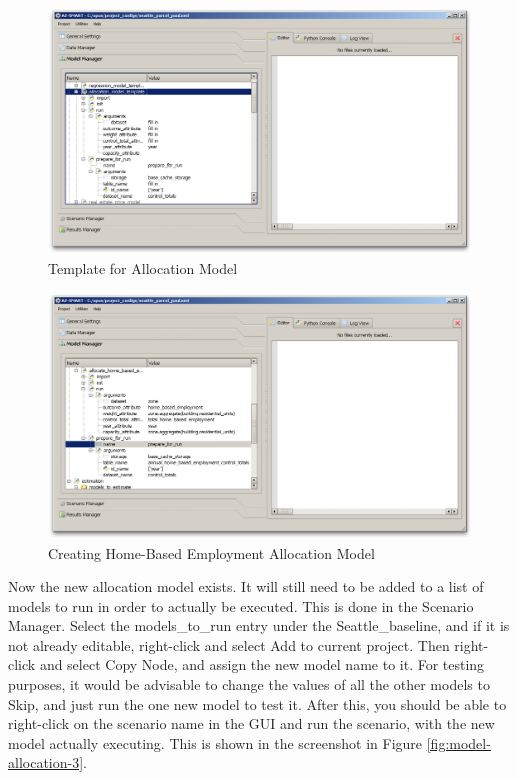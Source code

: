 \begin{figure}[htp]
\begin{center}
\includegraphics[scale=0.35]{graphics/create-model-template-allocation.png}
\end{center}
\caption{Template for Allocation Model}
\label{fig:model-allocation-1}
\end{figure}

\begin{figure}[htp]
\begin{center}
\includegraphics[scale=0.35]{graphics/create-allocation-model.png}
\end{center}
\caption{Creating Home-Based Employment Allocation Model}
\label{fig:model-allocation-2}
\end{figure}

Now the new allocation model exists.  It will still need to be added to a list of models to run in order to actually be executed.  This is done in the Scenario Manager.  Select the models\_to\_run entry under the Seattle\_baseline, and if it is not already editable, right-click and select Add to current project.  Then right-click and select Copy Node, and assign the new model name to it.  For testing purposes, it would be advisable to change the values of all the other models to Skip, and just run the one new model to test it.   After this, you should be able to right-click on the scenario name in the GUI and run the scenario, with the new model actually executing.  This is shown in the screenshot in Figure \ref{fig:model-allocation-3}.


